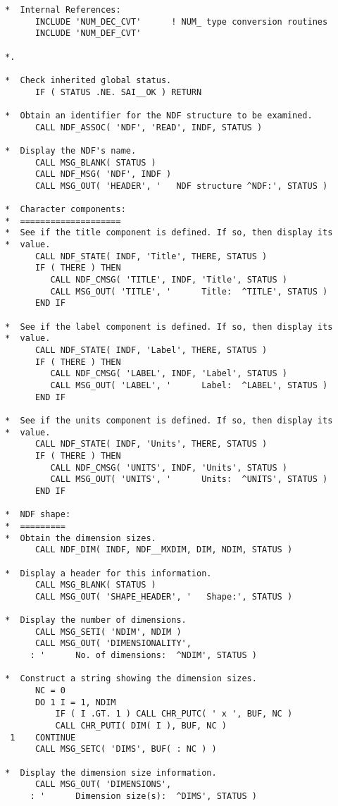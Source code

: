 \documentclass[twoside,11pt]{article}
\begin{document}
\begin{verbatim}
*  Internal References:
      INCLUDE 'NUM_DEC_CVT'      ! NUM_ type conversion routines
      INCLUDE 'NUM_DEF_CVT'

*.

*  Check inherited global status.
      IF ( STATUS .NE. SAI__OK ) RETURN

*  Obtain an identifier for the NDF structure to be examined.
      CALL NDF_ASSOC( 'NDF', 'READ', INDF, STATUS )

*  Display the NDF's name.
      CALL MSG_BLANK( STATUS )
      CALL NDF_MSG( 'NDF', INDF )
      CALL MSG_OUT( 'HEADER', '   NDF structure ^NDF:', STATUS )

*  Character components:
*  ====================
*  See if the title component is defined. If so, then display its
*  value.
      CALL NDF_STATE( INDF, 'Title', THERE, STATUS )
      IF ( THERE ) THEN
         CALL NDF_CMSG( 'TITLE', INDF, 'Title', STATUS )
         CALL MSG_OUT( 'TITLE', '      Title:  ^TITLE', STATUS )
      END IF

*  See if the label component is defined. If so, then display its
*  value.
      CALL NDF_STATE( INDF, 'Label', THERE, STATUS )
      IF ( THERE ) THEN
         CALL NDF_CMSG( 'LABEL', INDF, 'Label', STATUS )
         CALL MSG_OUT( 'LABEL', '      Label:  ^LABEL', STATUS )
      END IF

*  See if the units component is defined. If so, then display its
*  value.
      CALL NDF_STATE( INDF, 'Units', THERE, STATUS )
      IF ( THERE ) THEN
         CALL NDF_CMSG( 'UNITS', INDF, 'Units', STATUS )
         CALL MSG_OUT( 'UNITS', '      Units:  ^UNITS', STATUS )
      END IF

*  NDF shape:
*  =========
*  Obtain the dimension sizes.
      CALL NDF_DIM( INDF, NDF__MXDIM, DIM, NDIM, STATUS )

*  Display a header for this information.
      CALL MSG_BLANK( STATUS )
      CALL MSG_OUT( 'SHAPE_HEADER', '   Shape:', STATUS )

*  Display the number of dimensions.
      CALL MSG_SETI( 'NDIM', NDIM )
      CALL MSG_OUT( 'DIMENSIONALITY',
     : '      No. of dimensions:  ^NDIM', STATUS )

*  Construct a string showing the dimension sizes.
      NC = 0
      DO 1 I = 1, NDIM
          IF ( I .GT. 1 ) CALL CHR_PUTC( ' x ', BUF, NC )
          CALL CHR_PUTI( DIM( I ), BUF, NC )
 1    CONTINUE
      CALL MSG_SETC( 'DIMS', BUF( : NC ) )

*  Display the dimension size information.
      CALL MSG_OUT( 'DIMENSIONS',
     : '      Dimension size(s):  ^DIMS', STATUS )


\end{verbatim}
\end{document}

